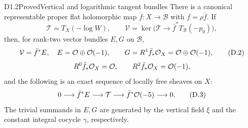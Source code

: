 \begin{claim}{D1.2}{Proved}{Vertical and logarithmic tangent bundles}
There is a canonical representable proper flat holomorphic map
$\bar f:X\to\mathcal B$ with $f=\rho\bar f$. If
\[
 \mathcal T=T_X(-\log W),\qquad
 \mathcal V=\ker\bigl(\mathcal T\to
                   \bar f^*T_{\mathcal B}(-p_0)\bigr),
\]
then, for rank-two vector bundles $E,G$ on $\mathcal B$,
\[
 \mathcal V=\bar f^*E,\quad E=\mathcal O\oplus\mathcal O(-1),\qquad
 G=R^1\bar f_*\mathcal O_X=\mathcal O\oplus\mathcal O(-1),                 \tag{D.2}
\]
\[
 R^0\bar f_*\mathcal O_X=\mathcal O,\qquad R^2\bar f_*\mathcal O_X=\mathcal O(-1),
\]
and the following is an exact sequence of locally free sheaves on $X$:
\[
 0\longrightarrow\bar f^*E\longrightarrow\mathcal T
 \longrightarrow\bar f^*\mathcal O(-5)\longrightarrow0.       \tag{D.3}
\]
The trivial summands in $E,G$ are generated by the vertical field $\xi$
and the constant integral cocycle $\gamma$, respectively.
\end{claim}
